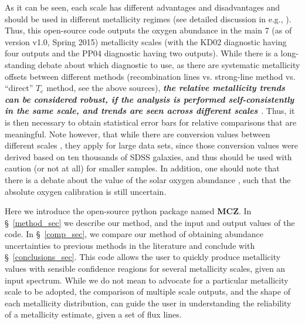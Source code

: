 \documentclass{emulateapj}
\begin{document}
As it can be seen, each scale has different advantages and disadvantages and should be used in different metallicity regimes (see detailed discussion in e.g.,  \citealt{kewley02,stasinska02,kewley08,moustakas10,lopezsanchez12,dopita13,blanc15}). Thus, this open-source code outputs the oxygen abundance in the main 7 (as of version v1.0, Spring 2015) metallicity scales (with the KD02 diagnostic having four outputs and the PP04 diagnostic having two outputs). While there is a long-standing debate about which diagnostic to use, as there are systematic metallicity offsets between different methods (recombination lines vs. strong-line method vs. ``direct'' $T_e$ method, see the above sources), \emph{\bf the relative metallicity trends can be considered robust, if the analysis is performed self-consistently in the same scale, and trends are seen across different scales \citep{kewley08,moustakas10}}. Thus, it is then necessary to obtain statistical error bars for relative comparisons that are meaningful. Note however, that while there are conversion values between different scales \citep{kewley08}, they apply for large data sets, since those conversion values were derived based on ten thousands of SDSS galaxies, and thus should be used with caution (or not at all) for smaller samples.
In addition, one should note that there is a debate about the value of the solar oxygen abundance \citep{asplund09_rev,chaffau11}, such that the absolute oxygen calibration is still uncertain.



Here we introduce the open-source python package named \textbf{MCZ}. In \S~\ref{method_sec} we describe our method, and the input and output values of the code. In \S~\ref{comp_sec}, we compare our method of obtaining abundance uncertainties to previous methods in the literature and conclude with \S~\ref{conclusions_sec}. This code allows the user to quickly produce metallicity values with sensible confidence reagions for several metallicity scales, given an input spectrum. While we do not mean to advocate for a particular metallicity scale to be adopted, the comparison of multiple scale outputs, and the shape of each metallicity distribution, can guide the user in understanding the reliability of a metallicity estimate, given a set of flux lines.
\end{document}
